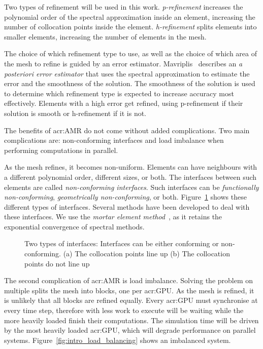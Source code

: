 Two types of refinement will be used in this work. \textit{p-refinement} increases the polynomial
order of the spectral approximation inside an element, increasing the number of collocation points
inside the element. \textit{h-refinement} splits elements into smaller elements, increasing the
number of elements in the mesh.

The choice of which refinement type to use, as well as the choice of which area of the mesh to
refine is guided by an error estimator. Mavriplis~\cite{Mavriplis1990} describes an \textit{a
posteriori error estimator} that uses the spectral approximation to estimate the error and the
smoothness of the solution. The smoothness of the solution is used to determine which refinement
type is expected to increase accuracy most effectively. Elements with a high error get refined, using
p-refinement if their solution is smooth or h-refinement if it is not.

The benefits of \acrshort{acr:AMR} do not come without added complications. Two main complications
are: non-conforming interfaces and load imbalance when performing computations in parallel.

As the mesh refines, it becomes non-uniform. Elements can have neighbours with a different
polynomial order, different sizes, or both. The interfaces between such elements are called
\textit{non-conforming interfaces}. Such interfaces can be \textit{functionally non-conforming},
\textit{geometrically non-conforming}, or both. Figure~\ref{fig:intro_interfaces} shows these
different types of interfaces. Several methods have been developed to deal with these interfaces. We
use the \textit{mortar element method}~\cite{Maday1989}, as it retains the exponential convergence
of spectral methods.

\begin{figure}[H]
	\centering
	\hfill
	\caption{Two types of interfaces: Interfaces can be either conforming or non-conforming. (a) The collocation points line up (b) The collocation points do not line up}\label{fig:intro_interfaces}
\end{figure}

The second complication of \acrshort{acr:AMR} is load imbalance. Solving the problem on multiple
 splits the mesh into blocks, one per \acrshort{acr:GPU}. As the mesh is
refined, it is unlikely that all blocks are refined equally. Every \acrshort{acr:GPU} must
synchronise at every time step, therefore  with less work to execute will be
waiting while the more heavily loaded  finish their computations. The simulation
time will be driven by the most heavily loaded \acrshort{acr:GPU}, which will degrade performance on
parallel systems. Figure~\ref{fig:intro_load_balancing} shows an imbalanced system.


